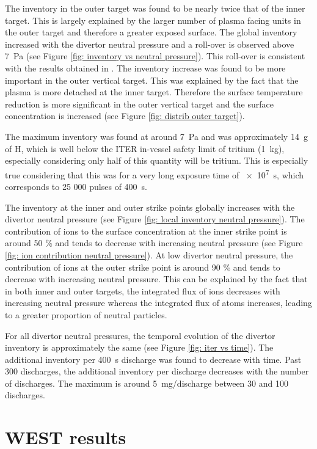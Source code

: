 The inventory in the outer target was found to be nearly twice that of the inner target.
This is largely explained by the larger number of plasma facing units in the outer target and therefore a greater exposed surface.
The global inventory increased with the divertor neutral pressure and a roll-over is observed above \SI{7}{Pa} (see Figure \ref{fig: inventory vs neutral pressure}).
This roll-over is consistent with the results obtained in .
The inventory increase was found to be more important in the outer vertical target.
This was explained by the fact that the plasma is more detached at the inner target.
Therefore the surface temperature reduction is more significant in the outer vertical target and the surface concentration is increased (see Figure \ref{fig: distrib outer target}).

The maximum inventory was found at around \SI{7}{Pa} and was approximately \SI{14}{g} of H, which is well below the ITER in-vessel safety limit of tritium (\SI{1}{kg}), especially considering only half of this quantity will be tritium.
This is especially true considering that this was for a very long exposure time of \SI{e7}{s}, which corresponds to 25 000 pulses of \SI{400}{s}.


The inventory at the inner and outer strike points globally increases with the divertor neutral pressure (see Figure \ref{fig: local inventory neutral pressure}).
The contribution of ions to the surface concentration at the inner strike point is around 50 \% and tends to decrease with increasing neutral pressure (see Figure \ref{fig: ion contribution neutral pressure}).
At low divertor neutral pressure, the contribution of ions at the outer strike point is around 90 \% and tends to decrease with increasing neutral pressure.
This can be explained by the fact that in both inner and outer targets, the integrated flux of ions decreases with increasing neutral pressure whereas the integrated flux of atoms increases, leading to a greater proportion of neutral particles.

For all divertor neutral pressures, the temporal evolution of the divertor inventory is approximately the same (see Figure \ref{fig: iter vs time}).
The additional inventory per \SI{400}{s} discharge was found to decrease with time.
Past 300 discharges, the additional inventory per discharge decreases with the number of discharges.
The maximum is around \SI{5}{mg/discharge} between 30 and 100 discharges.

\section{WEST results}

